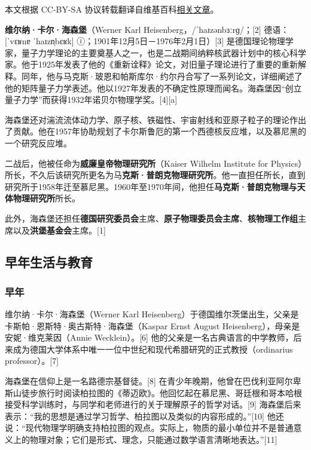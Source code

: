 
本文根据 CC-BY-SA 协议转载翻译自维基百科\href{https://en.wikipedia.org/wiki/Werner_Heisenberg}{相关文章}。

\textbf{维尔纳·卡尔·海森堡}（Werner Karl Heisenberg，/ˈhaɪzənbɜːrɡ/；[2] 德语：[ˈvɛʁnɐ ˈhaɪzn̩bɛʁk] ⓘ；1901年12月5日－1976年2月1日）[3] 是德国理论物理学家，量子力学理论的主要奠基人之一，也是二战期间纳粹核武器计划中的核心科学家。他于1925年发表了他的《重新诠释》论文，对旧量子理论进行了重要的重新解释。同年，他与马克斯·玻恩和帕斯库尔·约尔丹合写了一系列论文，详细阐述了他的矩阵量子力学表述。他以1927年发表的不确定性原理而闻名。海森堡因“创立量子力学”而获得1932年诺贝尔物理学奖。[4][a]  

海森堡还对湍流流体动力学、原子核、铁磁性、宇宙射线和亚原子粒子的理论作出了贡献。他在1957年协助规划了卡尔斯鲁厄的第一个西德核反应堆，以及慕尼黑的一个研究反应堆。  

二战后，他被任命为\textbf{威廉皇帝物理研究所}（Kaiser Wilhelm Institute for Physics）所长，不久后该研究所更名为马\textbf{克斯·普朗克物理研究所}。他一直担任所长，直到研究所于1958年迁至慕尼黑。1960年至1970年间，他担任\textbf{马克斯·普朗克物理与天体物理研究所}所长。  

此外，海森堡还担任\textbf{德国研究委员会}主席、\textbf{原子物理委员会}\textbf{主席}、\textbf{核物理工作组}主席以及\textbf{洪堡基金会}主席。[1]  
\subsection{早年生活与教育 }
\subsubsection{早年}  
维尔纳·卡尔·海森堡（Werner Karl Heisenberg）于德国维尔茨堡出生，父亲是卡斯帕·恩斯特·奥古斯特·海森堡（Kaspar Ernst August Heisenberg），母亲是安妮·维克莱因（Annie Wecklein）。[6] 他的父亲是一名古典语言的中学教师，后来成为德国大学体系中唯一一位中世纪和现代希腊研究的正式教授（ordinarius professor）。[7]  

海森堡在信仰上是一名路德宗基督徒。[8] 在青少年晚期，他曾在巴伐利亚阿尔卑斯山徒步旅行时阅读柏拉图的《蒂迈欧》。他回忆起在慕尼黑、哥廷根和哥本哈根接受科学训练时，与同学和老师进行的关于理解原子的哲学对话。[9] 海森堡后来表示：“我的思想是通过学习哲学、柏拉图以及类似的内容形成的。”[10] 他还说：“现代物理学明确支持柏拉图的观点。实际上，物质的最小单位并不是普通意义上的物理对象；它们是形式、理念，只能通过数学语言清晰地表达。”[11]  


